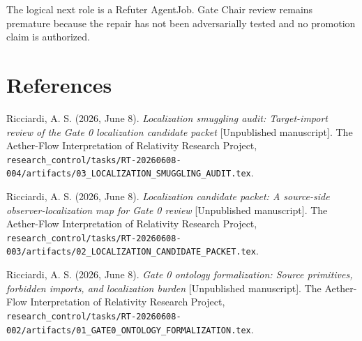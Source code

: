 \documentclass[11pt]{article}
\begin{document}
The logical next role is a Refuter AgentJob. Gate Chair review remains
premature because the repair has not been adversarially tested and no promotion
claim is authorized.

\section*{References}

Ricciardi, A. S. (2026, June 8). \emph{Localization smuggling audit:
Target-import review of the Gate 0 localization candidate packet}
[Unpublished manuscript]. The Aether-Flow Interpretation of Relativity
Research Project,
\texttt{research\_control/tasks/RT-20260608-004/artifacts/03\_LOCALIZATION\_SMUGGLING\_AUDIT.tex}.

Ricciardi, A. S. (2026, June 8). \emph{Localization candidate packet: A
source-side observer-localization map for Gate 0 review} [Unpublished
manuscript]. The Aether-Flow Interpretation of Relativity Research Project,
\texttt{research\_control/tasks/RT-20260608-003/artifacts/02\_LOCALIZATION\_CANDIDATE\_PACKET.tex}.

Ricciardi, A. S. (2026, June 8). \emph{Gate 0 ontology formalization: Source
primitives, forbidden imports, and localization burden} [Unpublished
manuscript]. The Aether-Flow Interpretation of Relativity Research Project,
\texttt{research\_control/tasks/RT-20260608-002/artifacts/01\_GATE0\_ONTOLOGY\_FORMALIZATION.tex}.
\end{document}
